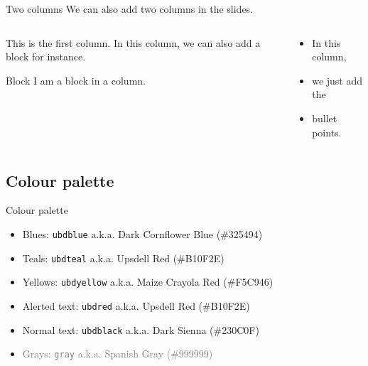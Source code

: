 \documentclass[,aspectratio=43]{beamer}
\providecommand{\tightlist}{%
  \setlength{\itemsep}{0pt}\setlength{\parskip}{0pt}}
\begin{document}
\begin{frame}{Two columns}
\protect\hypertarget{two-columns}{}
We can also add two columns in the slides.

\vspace{1em}

\begin{columns}[T]
\begin{column}{0.48\textwidth}
This is the first column. In this column, we can also add a block for
instance.

\begin{block}{Block}
\protect\hypertarget{block}{}
I am a block in a column.
\end{block}
\end{column}

\begin{column}{0.48\textwidth}
\begin{itemize}
\tightlist
\item
  In this column,
\item
  we just add the
\item
  bullet points.
\end{itemize}
\end{column}
\end{columns}
\end{frame}

\hypertarget{colour-palette}{%
\subsection{Colour palette}\label{colour-palette}}

\begin{frame}[fragile]{Colour palette}
\begin{itemize}
\tightlist
\item
  \textcolor{ubdblue}{Blues: \texttt{ubdblue} a.k.a. Dark Cornflower
  Blue (\#325494)}
\item
  \textcolor{ubdteal}{Teals: \texttt{ubdteal} a.k.a. Upsdell Red
  (\#B10F2E)}
\item
  \textcolor{ubdyellow}{Yellows: \texttt{ubdyellow} a.k.a. Maize Crayola
  Red (\#F5C946)}
\item
  \textcolor{ubdred}{Alerted text: \texttt{ubdred} a.k.a. Upsdell Red
  (\#B10F2E)}
\item
  \textcolor{ubdblack}{Normal text: \texttt{ubdblack} a.k.a. Dark Sienna
  (\#230C0F)}
\item
  \textcolor{gray}{Grays: \texttt{gray} a.k.a. Spanish Gray (\#999999)}
\end{itemize}
\end{frame}
\end{document}
